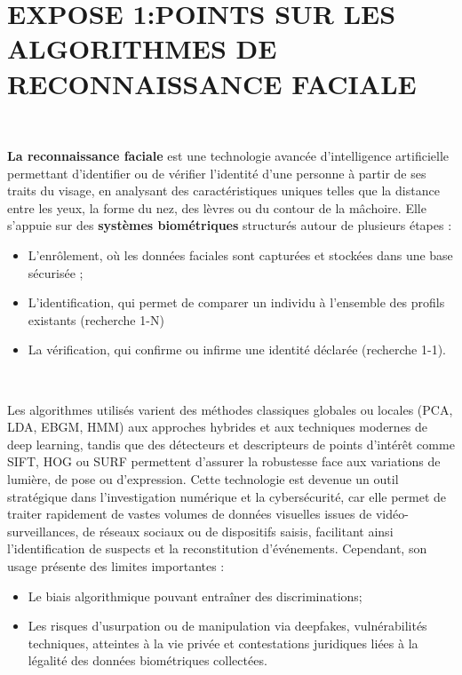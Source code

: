 \documentclass[12pt,a4paper]{report}
\begin{document}
	{\Large
	
\section*{EXPOSE 1:POINTS SUR LES ALGORITHMES DE RECONNAISSANCE FACIALE}\



 \textbf{La reconnaissance faciale} est une technologie avancée d’intelligence artificielle permettant d’identifier ou de vérifier l’identité d’une personne à partir de ses traits du visage, en analysant des caractéristiques uniques telles que la distance entre les yeux, la forme du nez, des lèvres ou du contour de la mâchoire. Elle s’appuie sur des \textbf{systèmes biométriques} structurés autour de plusieurs étapes :
 \begin{itemize}
 	\item L’enrôlement, où les données faciales sont capturées et stockées dans une base sécurisée ;
 	\item L’identification, qui permet de comparer un individu à l’ensemble des profils existants (recherche 1-N) 
 	\item La vérification, qui confirme ou infirme une identité déclarée (recherche 1-1).
 \end{itemize}\
  
 	Les algorithmes utilisés varient des méthodes classiques globales ou locales (PCA, LDA, EBGM, HMM) aux approches hybrides et aux techniques modernes de deep learning, tandis que des détecteurs et descripteurs de points d’intérêt comme SIFT, HOG ou SURF permettent d’assurer la robustesse face aux variations de lumière, de pose ou d’expression. Cette technologie est devenue un outil stratégique dans l’investigation numérique et la cybersécurité, car elle permet de traiter rapidement de vastes volumes de données visuelles issues de vidéo-surveillances, de réseaux sociaux ou de dispositifs saisis, facilitant ainsi l’identification de suspects et la reconstitution d’événements. Cependant, son usage présente des limites importantes :
 \begin{itemize}
  
 	\item Le biais algorithmique pouvant entraîner des discriminations; 
 	\item Les risques d’usurpation ou de manipulation via deepfakes, vulnérabilités techniques, atteintes à la vie privée et contestations juridiques liées à la légalité des données biométriques collectées.
 \end{itemize}
 
}
\end{document}
